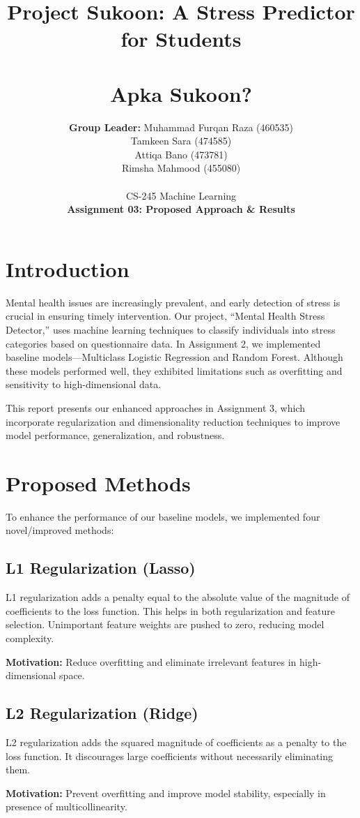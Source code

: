 \documentclass[a4paper,11pt]{article}
\title{\textbf{Project Sukoon: A Stress Predictor for Students} \\ \\[0.3cm] \large \textbf{Apka Sukoon?} }
\author{
  \textbf{Group Leader:} Muhammad Furqan Raza (460535)\\
  Tamkeen Sara (474585) \\
  Attiqa Bano (473781) \\
  Rimsha Mahmood (455080) \\
  \\CS-245 Machine Learning\\ 
  \textbf{Assignment 03: Proposed Approach \& Results}
}
\date{}
\begin{document}
\maketitle

\section{Introduction}
Mental health issues are increasingly prevalent, and early detection of stress is crucial in ensuring timely intervention. Our project, “Mental Health Stress Detector,” uses machine learning techniques to classify individuals into stress categories based on questionnaire data. In Assignment 2, we implemented baseline models—Multiclass Logistic Regression and Random Forest. Although these models performed well, they exhibited limitations such as overfitting and sensitivity to high-dimensional data.

This report presents our enhanced approaches in Assignment 3, which incorporate regularization and dimensionality reduction techniques to improve model performance, generalization, and robustness.

\section{Proposed Methods}
To enhance the performance of our baseline models, we implemented four novel/improved methods:

\subsection{L1 Regularization (Lasso)}
L1 regularization adds a penalty equal to the absolute value of the magnitude of coefficients to the loss function. This helps in both regularization and feature selection. Unimportant feature weights are pushed to zero, reducing model complexity.

\textbf{Motivation:} Reduce overfitting and eliminate irrelevant features in high-dimensional space.

\subsection{L2 Regularization (Ridge)}
L2 regularization adds the squared magnitude of coefficients as a penalty to the loss function. It discourages large coefficients without necessarily eliminating them.

\textbf{Motivation:} Prevent overfitting and improve model stability, especially in presence of multicollinearity.
\end{document}
